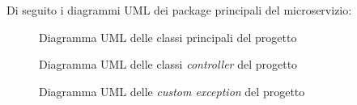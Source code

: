 \newpage
Di seguito i diagrammi UML dei package principali del microservizio:
\begin{figure}[H]
	\centering
	\caption{Diagramma UML delle classi principali del progetto}
	\label{fig:umlclass}
\end{figure}

\begin{figure}[H]
	\centering
	\caption{Diagramma UML delle classi \emph{controller} del progetto}
	\label{fig:umlcontroller}
\end{figure}

\begin{figure}[H]
	\centering
	\caption{Diagramma UML delle \emph{custom exception} del progetto}
	\label{fig:umlexception}
\end{figure}
\newpage


